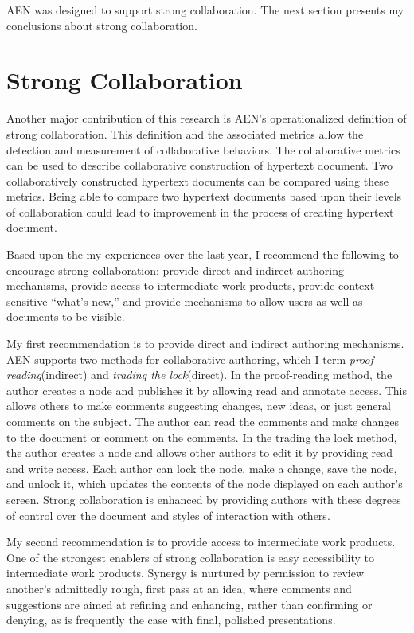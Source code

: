 AEN was designed to support strong collaboration.  The next section
presents my conclusions about strong collaboration.

\section{Strong Collaboration}
\label{sec:con-SC}

Another major contribution of this research is AEN's operationalized
definition of strong collaboration.  This definition and the associated
metrics allow the detection and measurement of collaborative behaviors.
The collaborative metrics can be used to describe collaborative
construction of hypertext document.  Two collaboratively constructed
hypertext documents can be compared using these metrics.  Being able to
compare two hypertext documents based upon their levels of collaboration
could lead to improvement in the process of creating hypertext document.

Based upon the my experiences over the last year, I recommend the following
to encourage strong collaboration: provide direct and indirect authoring
mechanisms, provide access to intermediate work products, provide
context-sensitive ``what's new,'' and provide mechanisms to allow users as
well as documents to be visible.

My first recommendation is to provide direct and indirect authoring
mechanisms.  AEN supports two methods for collaborative authoring, which I
term {\em proof-reading}(indirect) and {\em trading the lock}(direct).  In
the proof-reading method, the author creates a node and publishes it by
allowing read and annotate access.  This allows others to make comments
suggesting changes, new ideas, or just general comments on the subject.
The author can read the comments and make changes to the document or
comment on the comments.  In the trading the lock method, the author
creates a node and allows other authors to edit it by providing read and
write access.  Each author can lock the node, make a change, save the node,
and unlock it, which updates the contents of the node displayed on each
author's screen.  Strong collaboration is enhanced by providing authors
with these degrees of control over the document and styles of interaction
with others.

My second recommendation is to provide access to intermediate work
products.  One of the strongest enablers of strong collaboration is easy
accessibility to intermediate work products.  Synergy is nurtured by
permission to review another's admittedly rough, first pass at an idea,
where comments and suggestions are aimed at refining and enhancing, rather
than confirming or denying, as is frequently the case with final, polished
presentations.

